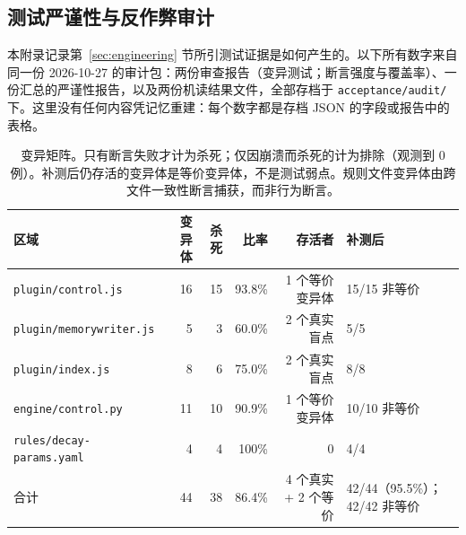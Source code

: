 \subsection{测试严谨性与反作弊审计}

本附录记录第~\ref{sec:engineering} 节所引测试证据是如何产生的。以下所有数字来自同一份 2026-10-27 的审计包：两份审查报告（变异测试；断言强度与覆盖率）、一份汇总的严谨性报告，以及两份机读结果文件，全部存档于 \texttt{acceptance/audit/} 下。这里没有任何内容凭记忆重建：每个数字都是存档 JSON 的字段或报告中的表格。

\begin{table}[t]
\centering
\caption{变异矩阵。只有断言失败才计为杀死；仅因崩溃而杀死的计为排除（观测到 0 例）。补测后仍存活的变异体是等价变异体，不是测试弱点。规则文件变异体由跨文件一致性断言捕获，而非行为断言。}
\scriptsize\setlength{\tabcolsep}{2.5pt}
\begin{tabular}{lrrrrl}
\toprule
区域 & 变异体 & 杀死 & 比率 & 存活者 & 补测后 \\
\midrule
\texttt{plugin/control.js}      & 16 & 15 & 93.8\% & 1 个等价变异体 & 15/15 非等价 \\
\texttt{plugin/\allowbreak{}memorywriter.\allowbreak{}js} &  5 &  3 & 60.0\% & 2 个真实盲点 & 5/5 \\
\texttt{plugin/index.js}        &  8 &  6 & 75.0\% & 2 个真实盲点 & 8/8 \\
\texttt{engine/control.py}      & 11 & 10 & 90.9\% & 1 个等价变异体 & 10/10 非等价 \\
\texttt{rules/\allowbreak{}decay-\allowbreak{}params.\allowbreak{}yaml}&  4 &  4 & 100\%  & 0 & 4/4 \\
\midrule
合计                           & 44 & 38 & 86.4\% & 4 个真实 + 2 个等价 & 42/44（95.5\%）；42/42 非等价 \\
\bottomrule
\end{tabular}
\end{table}

